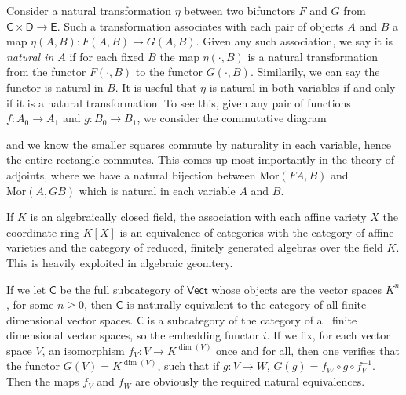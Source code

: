 Consider a natural transformation $\eta$ between two bifunctors $F$ and $G$ from $\mathsf{C} \times \mathsf{D} \to \mathsf{E}$. Such a transformation associates with each pair of objects $A$ and $B$ a map $\eta(A,B): F(A,B) \to G(A,B)$. Given any such association, we say it is \emph{natural in $A$} if for each fixed $B$ the map $\eta(\cdot,B)$ is a natural transformation from the functor $F(\cdot,B)$ to the functor $G(\cdot,B)$. Similarily, we can say the functor is natural in $B$. It is useful that $\eta$ is natural in both variables if and only if it is a natural transformation. To see this, given any pair of functions $f: A_0 \to A_1$ and $g: B_0 \to B_1$, we consider the commutative diagram
%
\begin{center}
\end{center}
%
and we know the smaller squares commute by naturality in each variable, hence the entire rectangle commutes. This comes up most importantly in the theory of adjoints, where we have a natural bijection between $\text{Mor}(FA,B)$ and $\text{Mor}(A,GB)$ which is natural in each variable $A$ and $B$.

\begin{example}
    If $K$ is an algebraically closed field, the association with each affine variety $X$ the coordinate ring $K[X]$ is an equivalence of categories with the category of affine varieties and the category of reduced, finitely generated algebras over the field $K$. This is heavily exploited in algebraic geomtery.
\end{example}

\begin{example}
    If we let $\mathsf{C}$ be the full subcategory of $\mathsf{Vect}$ whose objects are the vector spaces $K^n$, for some $n \geq 0$, then $\mathsf{C}$ is naturally equivalent to the category of all finite dimensional vector spaces. $\mathsf{C}$ is a subcategory of the category of all finite dimensional vector spaces, so the embedding functor $i$. If we fix, for each vector space $V$, an isomorphism $f_V: V \to K^{\dim(V)}$ once and for all, then one verifies that the functor $G(V) = K^{\dim(V)}$, such that if $g: V \to W$, $G(g) = f_W \circ g \circ f_V^{-1}$. Then the maps $f_V$ and $f_W$ are obviously the required natural equivalences.
\end{example}

